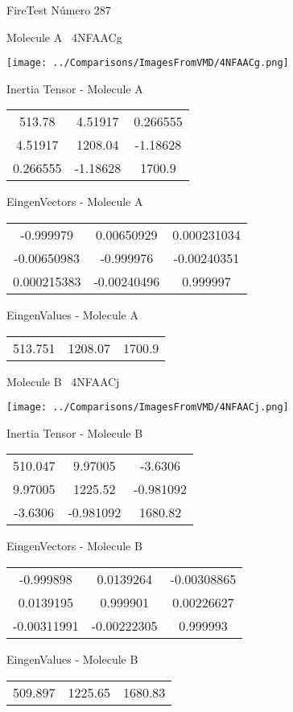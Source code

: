 \vtab[-3cm]
\begin{center}
{\large FireTest \tab Número 287}
\end{center}
\begin{multicols}{2}
\begin{center}

Molecule A \
4NFAACg

\texttt{[image: ../Comparisons/ImagesFromVMD/4NFAACg.png]}

Inertia Tensor - Molecule A \\
\begin{tabular}{|c c c|}
513.78	 & 	4.51917	 & 	0.266555	 \\
4.51917	 & 	1208.04	 & 	-1.18628	 \\
0.266555	 & 	-1.18628	 & 	1700.9
\end{tabular}

\vtab
 EingenVectors - Molecule A     \\
\begin{tabular}{|c c c|}
-0.999979	 & 	0.00650929	 & 	0.000231034	 \\
-0.00650983	 & 	-0.999976	 & 	-0.00240351	 \\
0.000215383	 & 	-0.00240496	 & 	0.999997
\end{tabular}

\vtab
 EingenValues - Molecule A     \\
\begin{tabular}{|c c c|}
513.751	 & 	1208.07	 & 	1700.9	 \\
\end{tabular}
\columnbreak

Molecule B \
4NFAACj

\texttt{[image: ../Comparisons/ImagesFromVMD/4NFAACj.png]}

Inertia Tensor - Molecule B \\
\begin{tabular}{|c c c|}
510.047	 & 	9.97005	 & 	-3.6306	 \\
9.97005	 & 	1225.52	 & 	-0.981092	 \\
-3.6306	 & 	-0.981092	 & 	1680.82
\end{tabular}

\vtab
 EingenVectors - Molecule B     \\
\begin{tabular}{|c c c|}
-0.999898	 & 	0.0139264	 & 	-0.00308865	 \\
0.0139195	 & 	0.999901	 & 	0.00226627	 \\
-0.00311991	 & 	-0.00222305	 & 	0.999993
\end{tabular}

\vtab
 EingenValues - Molecule B     \\
\begin{tabular}{|c c c|}
509.897	 & 	1225.65	 & 	1680.83	 \\
\end{tabular}

\end{center}
\end{multicols}

